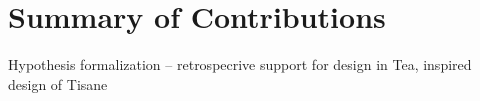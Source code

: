 











\section{Summary of Contributions}

Hypothesis formalization -- retrospecrive support for design in Tea, inspired design of Tisane

